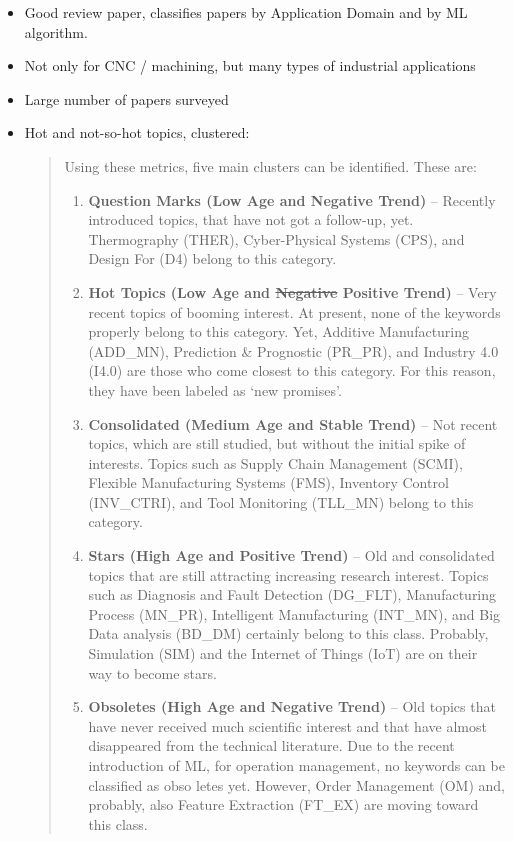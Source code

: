 \documentclass[
  letterpaper,
  DIV=11,
  numbers=noendperiod]{scrartcl}
\providecommand{\tightlist}{%
  \setlength{\itemsep}{0pt}\setlength{\parskip}{0pt}}\usepackage{longtable,booktabs,array}
\begin{document}
\begin{itemize}
\item
  Good review paper, classifies papers by Application Domain and by ML
  algorithm.
\item
  Not only for CNC / machining, but many types of industrial
  applications
\item
  Large number of papers surveyed
\item
  Hot and not-so-hot topics, clustered:

  \begin{quote}
  Using these metrics, five main clusters can be identified. These are:

  \begin{enumerate}
  \def\labelenumi{\arabic{enumi}.}
  \tightlist
  \item
    \textbf{Question Marks (Low Age and Negative Trend)} -- Recently
    introduced topics, that have not got a follow-up, yet. Thermography
    (THER), Cyber-Physical Systems (CPS), and Design For (D4) belong to
    this category.
  \item
    \textbf{Hot Topics (Low Age and \sout{Negative} Positive Trend)} --
    Very recent topics of booming interest. At present, none of the
    keywords properly belong to this category. Yet, Additive
    Manufacturing (ADD\_MN), Prediction \& Prognostic (PR\_PR), and
    Industry 4.0 (I4.0) are those who come closest to this category. For
    this reason, they have been labeled as `new promises'.
  \item
    \textbf{Consolidated (Medium Age and Stable Trend)} -- Not recent
    topics, which are still studied, but without the initial spike of
    interests. Topics such as Supply Chain Management (SCMI), Flexible
    Manufacturing Systems (FMS), Inventory Control (INV\_CTRI), and Tool
    Monitoring (TLL\_MN) belong to this category.
  \item
    \textbf{Stars (High Age and Positive Trend)} -- Old and consolidated
    topics that are still attracting increasing research interest.
    Topics such as Diagnosis and Fault Detection (DG\_FLT),
    Manufacturing Process (MN\_PR), Intelligent Manufacturing (INT\_MN),
    and Big Data analysis (BD\_DM) certainly belong to this class.
    Probably, Simulation (SIM) and the Internet of Things (IoT) are on
    their way to become stars.
  \item
    \textbf{Obsoletes (High Age and Negative Trend)} -- Old topics that
    have never received much scientific interest and that have almost
    disappeared from the technical literature. Due to the recent
    introduction of ML, for operation management, no keywords can be
    classified as obso­ letes yet. However, Order Management (OM) and,
    probably, also Feature Extraction (FT\_EX) are moving toward this
    class.
  \end{enumerate}
  \end{quote}


\end{itemize}
\end{document}
